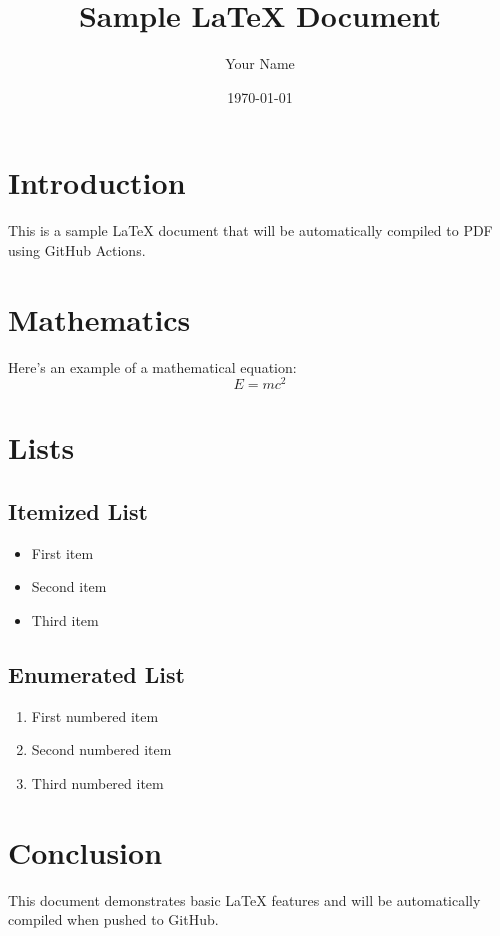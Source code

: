 \documentclass[12pt,a4paper]{article}
\title{Sample LaTeX Document}
\author{Your Name}
\date{\today}
\begin{document}
\maketitle

\section{Introduction}
This is a sample LaTeX document that will be automatically compiled to PDF using GitHub Actions.

\section{Mathematics}
Here's an example of a mathematical equation:
\begin{equation}
    E = mc^2
\end{equation}

\section{Lists}
\subsection{Itemized List}
\begin{itemize}
    \item First item
    \item Second item
    \item Third item
\end{itemize}

\subsection{Enumerated List}
\begin{enumerate}
    \item First numbered item
    \item Second numbered item
    \item Third numbered item
\end{enumerate}

\section{Conclusion}
This document demonstrates basic LaTeX features and will be automatically compiled when pushed to GitHub.
\end{document}
